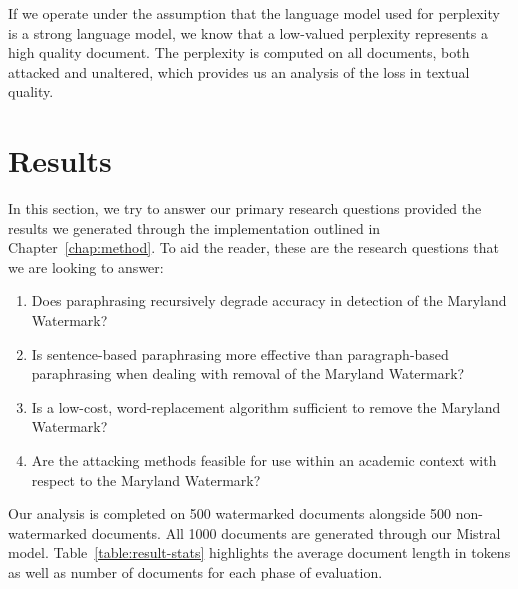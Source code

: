 \documentclass{l4proj}
\theoremstyle{definition}
\begin{document}
        If we operate under the assumption that the language model used for perplexity is a strong language model, we know that a low-valued perplexity represents a high quality document. The perplexity is computed on all documents, both attacked and unaltered, which provides us an analysis of the loss in textual quality.


\chapter{Results} 
\label{chap:results}
In this section, we try to answer our primary research questions provided the results we generated through the implementation outlined in Chapter~\ref{chap:method}. To aid the reader, these are the research questions that we are looking to answer: 
\begin{enumerate}[label={\textbf{RQ\arabic*}:}, leftmargin=4em]
    \item Does paraphrasing recursively degrade accuracy in detection of the Maryland Watermark?
   \item Is sentence-based paraphrasing more effective than paragraph-based paraphrasing when dealing with removal of the Maryland Watermark?
    \item Is a low-cost, word-replacement algorithm sufficient to remove the Maryland Watermark? 
    \item Are the attacking methods feasible for use within an academic context with respect to the Maryland Watermark?
\end{enumerate}
Our analysis is completed on 500 watermarked documents alongside 500 non-watermarked documents. All 1000 documents are generated through our Mistral model. Table~\ref{table:result-stats} highlights the average document length in tokens as well as number of documents for each phase of evaluation.
\end{document}
